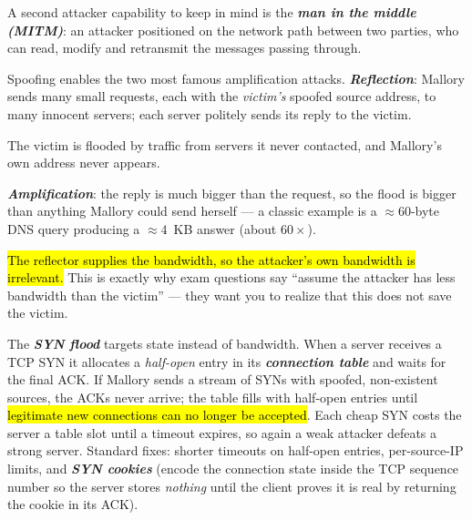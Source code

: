 \documentclass[12pt, a4paper]{article}
\newcommand{\term}[1]{\textbf{\textit{#1}}}        %
\newcommand{\imp}[1]{\hl{#1}}                       %
\begin{document}
A second attacker capability to keep in mind is the \term{man in the middle (MITM)}: an attacker positioned on the network path between two parties, who can read, modify and retransmit the messages passing through.

Spoofing enables the two most famous amplification attacks. \term{Reflection}: Mallory sends many small requests, each with the \emph{victim's} spoofed source address, to many innocent servers; each server politely sends its reply to the victim.

The victim is flooded by traffic from servers it never contacted, and Mallory's own address never appears.

\term{Amplification}: the reply is much bigger than the request, so the flood is bigger than anything Mallory could send herself --- a classic example is a $\approx 60$-byte DNS query producing a $\approx 4$~KB answer (about $60\times$).

\imp{The reflector supplies the bandwidth, so the attacker's own bandwidth is irrelevant.} This is exactly why exam questions say ``assume the attacker has less bandwidth than the victim'' --- they want you to realize that this does not save the victim.

The \term{SYN flood} targets state instead of bandwidth. When a server receives a TCP SYN it allocates a \emph{half-open} entry in its \term{connection table} and waits for the final ACK.
If Mallory sends a stream of SYNs with spoofed, non-existent sources, the ACKs never arrive; the table fills with half-open entries until \imp{legitimate new connections can no longer be accepted}.
Each cheap SYN costs the server a table slot until a timeout expires, so again a weak attacker defeats a strong server.
Standard fixes: shorter timeouts on half-open entries, per-source-IP limits, and \term{SYN cookies} (encode the connection state inside the TCP sequence number so the server stores \emph{nothing} until the client proves it is real by returning the cookie in its ACK).
\end{document}
